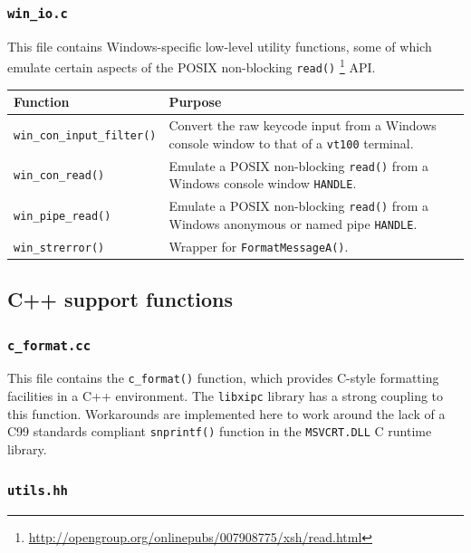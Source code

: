 \documentclass[11pt]{article}
\begin{document}
\subsubsection{{\tt win\_io.c}}

This file contains Windows-specific low-level utility functions, some of which emulate
certain aspects of the POSIX non-blocking
{\tt read()}
\footnote{\url{http://opengroup.org/onlinepubs/007908775/xsh/read.html}}
API.
\begin{center}
\begin{tabular}{ | l | p{8cm} | }
 \hline
Function & Purpose \\
 \hline\hline
   {\tt win\_con\_input\_filter()} &
    Convert the raw keycode input from a Windows console window to that of a {\tt vt100} terminal. \\

   {\tt win\_con\_read()} &
    Emulate a POSIX non-blocking {\tt read()}
    from a Windows console window {\tt HANDLE}. \\

   {\tt win\_pipe\_read()} &
    Emulate a POSIX non-blocking {\tt read()} from a Windows anonymous or named pipe {\tt HANDLE}. \\

   {\tt win\_strerror()} &
    Wrapper for {\tt FormatMessageA()}. \\
 \hline
\end{tabular}
\end{center}


\subsection{C++ support functions}

\subsubsection{{\tt c\_format.cc}}

This file contains the {\tt c\_format()} function, which provides C-style
formatting facilities in a C++ environment. The {\tt libxipc} library has
a strong coupling to this function. Workarounds are implemented here
to work around the lack of a C99 standards compliant {\tt snprintf()}
function in the {\tt MSVCRT.DLL} C runtime library.

\subsubsection{{\tt utils.hh}}
\end{document}
